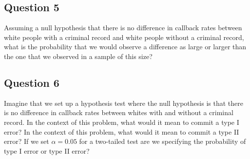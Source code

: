 \documentclass[]{article}
\begin{document}
\subsection{Question 5}\label{question-5}

Assuming a null hypothesis that there is no difference in callback rates
between white people with a criminal record and white people without a
criminal record, what is the probability that we would observe a
difference as large or larger than the one that we observed in a sample
of this size?

\subsection{Question 6}\label{question-6}

Imagine that we set up a hypothesis test where the null hypothesis is
that there is no difference in callback rates between whites with and
without a criminal record. In the context of this problem, what would it
mean to commit a type I error? In the context of this problem, what
would it mean to commit a type II error? If we set $\alpha = 0.05$ for a
two-tailed test are we specifying the probability of type I error or
type II error?
\end{document}
